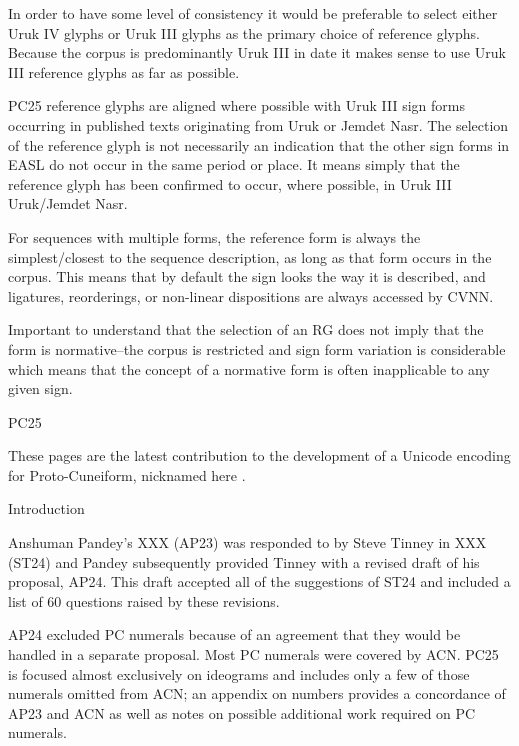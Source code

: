 \par In order to have some level of consistency it would be
      preferable to select either Uruk IV glyphs or Uruk III glyphs
      as the primary choice of reference glyphs.  Because the corpus
      is predominantly Uruk III in date it makes sense to use Uruk
      III reference glyphs as far as possible.


\par PC25 reference glyphs are aligned where possible with Uruk
      III sign forms occurring in published texts originating from
      Uruk or Jemdet Nasr. The selection of the reference glyph is not
      necessarily an indication that the other sign forms in EASL do
      not occur in the same period or place.  It means simply that the
      reference glyph has been confirmed to occur, where possible, in
      Uruk III Uruk/Jemdet Nasr.


\par For sequences with multiple forms, the reference form is
      always the simplest/closest to the sequence description, as long
      as that form occurs in the corpus.  This means that by default
      the sign looks the way it is described, and ligatures,
      reorderings, or non-linear dispositions are always accessed by
      CVNN.


\par Important to understand that the selection of an RG does not
      imply that the form is normative--the corpus is restricted and
      sign form variation is considerable which means that the concept
      of a normative form is often inapplicable to any given sign.

\Hh{}PC25


\par These pages are the latest contribution to the development of
      a Unicode encoding for Proto-Cuneiform, nicknamed here
      .

\Hh{}Introduction


\par Anshuman Pandey's XXX (AP23) was responded to by Steve Tinney
      in XXX (ST24) and Pandey subsequently provided Tinney with a
      revised draft of his proposal, AP24. This draft accepted all of
      the suggestions of ST24 and included a list of 60 questions
      raised by these revisions.


\par AP24 excluded PC numerals because of an agreement that they
      would be handled in a separate proposal.  Most PC numerals were
      covered by ACN.  PC25 is focused almost exclusively on ideograms
      and includes only a few of those numerals omitted from ACN; an
      appendix on numbers provides a concordance of AP23 and ACN as
      well as notes on possible additional work required on PC
      numerals.


